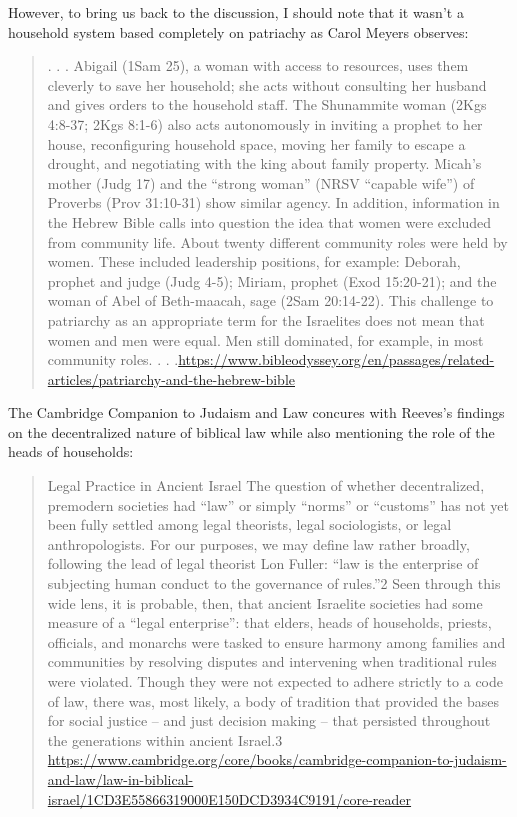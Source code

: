 \documentclass[11pt]{article}
\begin{document}
{However, to bring us back to the discussion, I should note that it wasn't a household system based completely on patriachy as Carol Meyers observes:
\begin{quote}
. . . 
 Abigail (1Sam 25), a woman with access to resources, uses them cleverly to save her household; she acts without consulting her husband and gives orders to the household staff. The Shunammite woman (2Kgs 4:8-37; 2Kgs 8:1-6) also acts autonomously in inviting a prophet to her house, reconfiguring household space, moving her family to escape a drought, and negotiating with the king about family property. Micah’s mother (Judg 17) and the “strong woman” (NRSV “capable wife”) of Proverbs (Prov 31:10-31) show similar agency. In addition, information in the Hebrew Bible calls into question the idea that women were excluded from community life. About twenty different community roles were held by women. These included leadership positions, for example: Deborah, prophet and judge (Judg 4-5); Miriam, prophet (Exod 15:20-21); and the woman of Abel of Beth-maacah, sage (2Sam 20:14-22). This challenge to patriarchy as an appropriate term for the Israelites does not mean that women and men were equal. Men still dominated, for example, in most community roles. . . .\url{https://www.bibleodyssey.org/en/passages/related-articles/patriarchy-and-the-hebrew-bible}
\end{quote}

The Cambridge Companion to Judaism and Law concures with Reeves's findings on the decentralized nature of biblical law while also mentioning the role of the heads of households:

\begin{quote}
Legal Practice in Ancient Israel
The question of whether decentralized, premodern societies had “law” or simply “norms” or “customs” has not yet been fully settled among legal theorists, legal sociologists, or legal anthropologists. For our purposes, we may define law rather broadly, following the lead of legal theorist Lon Fuller: “law is the enterprise of subjecting human conduct to the governance of rules.”2 Seen through this wide lens, it is probable, then, that ancient Israelite societies had some measure of a “legal enterprise”: that elders, heads of households, priests, officials, and monarchs were tasked to ensure harmony among families and communities by resolving disputes and intervening when traditional rules were violated. Though they were not expected to adhere strictly to a code of law, there was, most likely, a body of tradition that provided the bases for social justice – and just decision making – that persisted throughout the generations within ancient Israel.3 \url{https://www.cambridge.org/core/books/cambridge-companion-to-judaism-and-law/law-in-biblical-israel/1CD3E55866319000E150DCD3934C9191/core-reader}
\end{quote} 

}
\end{document}
